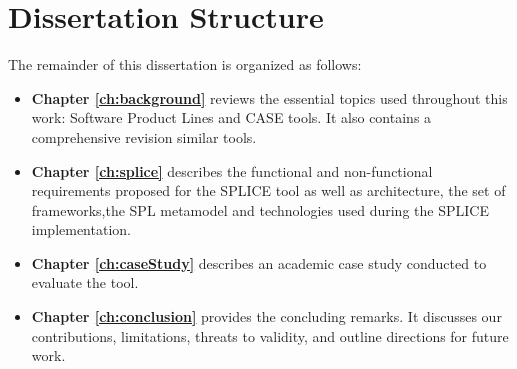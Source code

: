 \section{Dissertation Structure}
\label{sc:structure}
The remainder of this dissertation is organized as follows:

\begin{itemize}
\item \textbf{ Chapter \ref{ch:background} } reviews the essential topics used throughout this work: Software Product Lines and \ac{CASE} tools. It also contains a comprehensive revision similar tools.

\item \textbf{ Chapter \ref{ch:splice} } describes the functional and non-functional requirements proposed for the \ac{SPLICE} tool as well as architecture, the set of frameworks,the SPL metamodel and technologies used during the \ac{SPLICE} implementation.

\item \textbf{ Chapter \ref{ch:caseStudy} } describes an academic case study conducted to evaluate the tool.

\item \textbf{ Chapter \ref{ch:conclusion} } provides the concluding remarks. It discusses our contributions, limitations, threats to validity,  and outline directions for future work.




\end{itemize}

